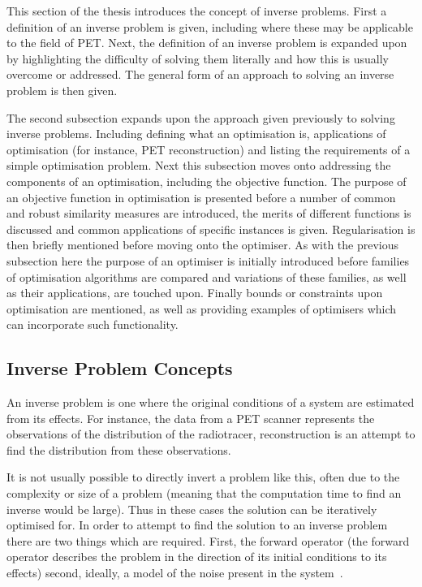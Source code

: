         This section of the thesis introduces the concept of inverse problems. First a definition of an inverse problem is given, including where these may be applicable to the field of \gls{PET}. Next, the definition of an inverse problem is expanded upon by highlighting the difficulty of solving them literally and how this is usually overcome or addressed. The general form of an approach to solving an inverse problem is then given.
            
        The second subsection expands upon the approach given previously to solving inverse problems. Including defining what an optimisation is, applications of optimisation (for instance, \gls{PET} reconstruction) and listing the requirements of a simple optimisation problem. Next this subsection moves onto addressing the components of an optimisation, including the objective function. The purpose of an objective function in optimisation is presented before a number of common and robust similarity measures are introduced, the merits of different functions is discussed and common applications of specific instances is given. Regularisation is then briefly mentioned before moving onto the optimiser. As with the previous subsection here the purpose of an optimiser is initially introduced before families of optimisation algorithms are compared and variations of these families, as well as their applications, are touched upon. Finally bounds or constraints upon optimisation are mentioned, as well as providing examples of optimisers which can incorporate such functionality.
        
        \subsection{Inverse Problem Concepts} \label{sec:inverse_problem_concepts}
            An inverse problem is one where the original conditions of a system are estimated from its effects. For instance, the data from a \gls{PET} scanner represents the observations of the distribution of the radiotracer, reconstruction is an attempt to find the distribution from these observations.
            
            It is not usually possible to directly invert a problem like this, often due to the complexity or size of a problem (meaning that  the computation time to find an inverse would be large). Thus in these cases the solution can be iteratively optimised for. In order to attempt to find the solution to an inverse problem there are two things which are required. First, the forward operator (the forward operator describes the problem in the direction of its initial conditions to its effects) %
            second, ideally, a model of the noise present in the system~\parencite{Brusaferri2020ImprovingInformation, Emond2020ImprovingEffectiveness}. %
        
